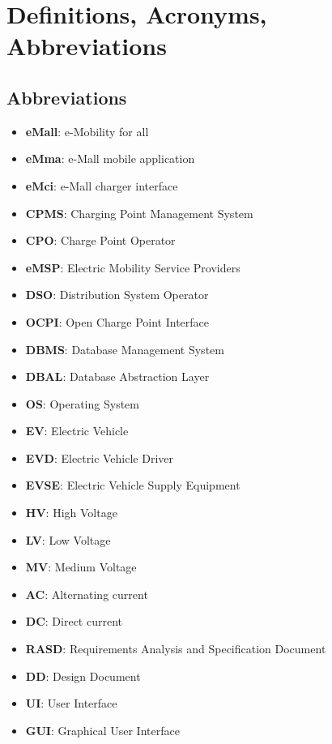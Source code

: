 \section{Definitions, Acronyms, Abbreviations}
\label{sec:Definitions, Acronyms, Abbreviations}%
\subsection{Abbreviations}
\begin{itemize}
    \item \textbf{eMall}: e-Mobility for all
    \item \textbf{eMma}: e-Mall mobile application
    \item \textbf{eMci}: e-Mall charger interface
    \item \textbf{CPMS}: Charging Point Management System
    \item \textbf{CPO}: Charge Point Operator
    \item \textbf{eMSP}: Electric Mobility Service Providers
    \item \textbf{DSO}: Distribution System Operator
    \item \textbf{OCPI}: Open Charge Point Interface
    \item \textbf{DBMS}: Database Management System
    \item \textbf{DBAL}: Database Abstraction Layer
    \item \textbf{OS}: Operating System
    \item \textbf{EV}: Electric Vehicle
    \item \textbf{EVD}: Electric Vehicle Driver
    \item \textbf{EVSE}: Electric Vehicle Supply Equipment
    \item \textbf{HV}: High Voltage
    \item \textbf{LV}: Low Voltage
    \item \textbf{MV}: Medium Voltage
    \item \textbf{AC}: Alternating current
    \item \textbf{DC}: Direct current
    \item \textbf{RASD}: Requirements Analysis and Specification Document
    \item \textbf{DD}: Design Document
    \item \textbf{UI}: User Interface
    \item \textbf{GUI}: Graphical User Interface
\end{itemize}

